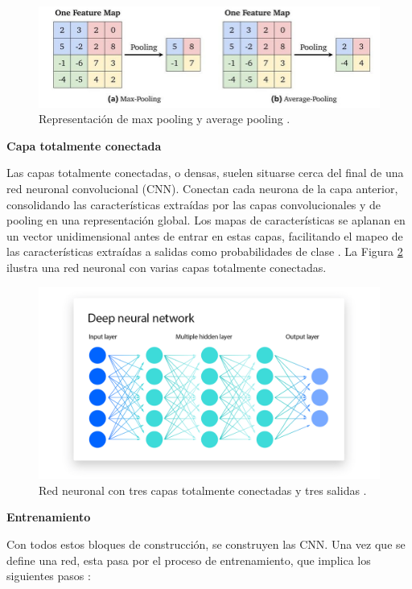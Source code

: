 \documentclass[a4paper,10pt]{book}
\begin{document}
\begin{figure}[h!]
    \centering
    \includegraphics[width=1.0\linewidth]{reports//assets/pooling.jpg}
    \caption[Operaciones de pooling populares]{Representación de max pooling y average pooling \cite{SkinLesionClassification}.}
    \label{fig:pooling_operations}
\end{figure}

\textbf{Capa totalmente conectada}

Las capas totalmente conectadas, o densas, suelen situarse cerca del final de una red neuronal convolucional (CNN). Conectan cada neurona de la capa anterior, consolidando las características extraídas por las capas convolucionales y de pooling en una representación global. Los mapas de características se aplanan en un vector unidimensional antes de entrar en estas capas, facilitando el mapeo de las características extraídas a salidas como probabilidades de clase \cite{noauthor_fully_nodate}. La Figura \ref{fig:fc_layers} ilustra una red neuronal con varias capas totalmente conectadas.

\begin{figure}[h!]
    \centering
    \includegraphics[width=0.75\linewidth]{reports//assets/fc_network.png}
    \caption[Capas totalmente conectadas]{Red neuronal con tres capas totalmente conectadas y tres salidas \cite{bergmann_what_2024}.}
    \label{fig:fc_layers}
\end{figure}


\textbf{Entrenamiento}

Con todos estos bloques de construcción, se construyen las CNN. Una vez que se define una red, esta pasa por el proceso de entrenamiento, que implica los siguientes pasos \cite{bergmann_what_2024}:
\end{document}
